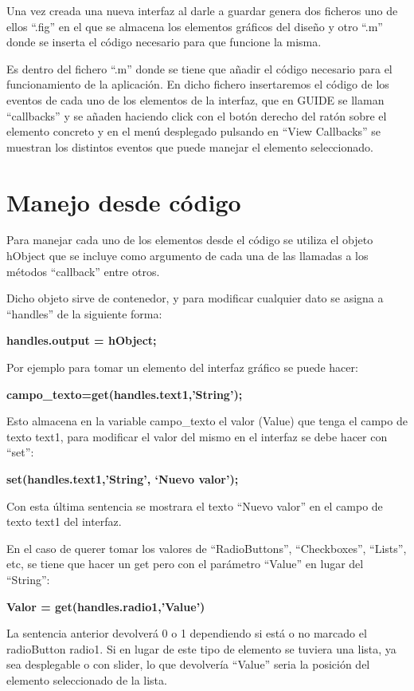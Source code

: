 Una vez creada una nueva interfaz al darle a guardar genera dos ficheros uno de ellos “.fig” en el que se almacena los elementos gráficos del diseño y otro “.m” donde se inserta el código necesario para que funcione la misma.
\bigskip

Es dentro del fichero “.m” donde se tiene que añadir el código necesario para el funcionamiento de la aplicación. En dicho fichero insertaremos el código de los eventos de cada uno de los elementos de la interfaz, que en GUIDE se llaman “callbacks” y se añaden haciendo click con el botón derecho del ratón sobre el elemento concreto y en el menú desplegado pulsando en “View Callbacks” se muestran los distintos eventos que puede manejar el elemento seleccionado.
\bigskip

\section{Manejo desde código}

Para manejar cada uno de los elementos desde el código se utiliza el objeto hObject que se incluye como argumento de cada una de las llamadas a los métodos “callback” entre otros.
\bigskip

Dicho objeto sirve de contenedor, y para modificar cualquier dato se asigna a “handles” de la siguiente forma:
\bigskip

\textbf{handles.output = hObject;} 
\bigskip

Por ejemplo para tomar un elemento del interfaz gráfico se puede hacer:

\bigskip

\textbf{campo\_texto=get(handles.text1,’String’);}
\bigskip

Esto almacena en la variable campo\_texto el valor (Value) que tenga el campo de texto text1, para modificar el valor del mismo en el interfaz se debe  hacer con “set”:
\bigskip

\textbf{set(handles.text1,’String’, ‘Nuevo valor’);}
\bigskip

Con esta última sentencia se mostrara el texto “Nuevo valor” en el campo de texto text1 del interfaz.
\bigskip

En el caso de querer tomar los valores de “RadioButtons”, “Checkboxes”, “Lists”, etc, se tiene que hacer un get pero con el parámetro “Value” en lugar del “String”:
\bigskip

\textbf{Valor = get(handles.radio1,’Value’)}
\bigskip

La sentencia anterior devolverá 0 o 1 dependiendo si está o no marcado el radioButton radio1. Si en lugar de este tipo de elemento se tuviera una lista, ya sea desplegable o con slider, lo que devolvería “Value” seria la posición del elemento seleccionado de la lista.
\bigskip

